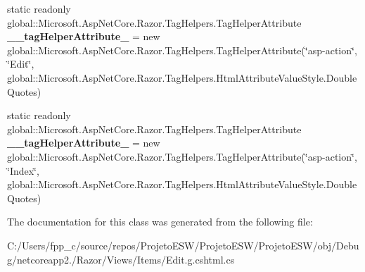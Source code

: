 \begin{DoxyCompactItemize}
\item 
\mbox{\label{class_asp_net_core_1_1_views___items___edit_a2b619c599e0869ce3dda061d55d4177c}} 
static readonly global\+::\+Microsoft.\+Asp\+Net\+Core.\+Razor.\+Tag\+Helpers.\+Tag\+Helper\+Attribute {\bfseries \+\_\+\+\_\+tag\+Helper\+Attribute\+\_} = new global\+::\+Microsoft.\+Asp\+Net\+Core.\+Razor.\+Tag\+Helpers.\+Tag\+Helper\+Attribute(\char`\"{}asp-\/action\char`\"{}, \char`\"{}Edit\char`\"{}, global\+::\+Microsoft.\+Asp\+Net\+Core.\+Razor.\+Tag\+Helpers.\+Html\+Attribute\+Value\+Style.\+Double\+Quotes)
\item 
\mbox{\label{class_asp_net_core_1_1_views___items___edit_a9fc396e07b516d76ed135036e3380aa5}} 
static readonly global\+::\+Microsoft.\+Asp\+Net\+Core.\+Razor.\+Tag\+Helpers.\+Tag\+Helper\+Attribute {\bfseries \+\_\+\+\_\+tag\+Helper\+Attribute\+\_} = new global\+::\+Microsoft.\+Asp\+Net\+Core.\+Razor.\+Tag\+Helpers.\+Tag\+Helper\+Attribute(\char`\"{}asp-\/action\char`\"{}, \char`\"{}Index\char`\"{}, global\+::\+Microsoft.\+Asp\+Net\+Core.\+Razor.\+Tag\+Helpers.\+Html\+Attribute\+Value\+Style.\+Double\+Quotes)
\end{DoxyCompactItemize}


The documentation for this class was generated from the following file\+:\begin{DoxyCompactItemize}
\item 
C\+:/\+Users/fpp\+\_\+c/source/repos/\+Projeto\+E\+S\+W/\+Projeto\+E\+S\+W/\+Projeto\+E\+S\+W/obj/\+Debug/netcoreapp2./\+Razor/\+Views/\+Items/Edit.\+g.\+cshtml.\+cs\end{DoxyCompactItemize}
